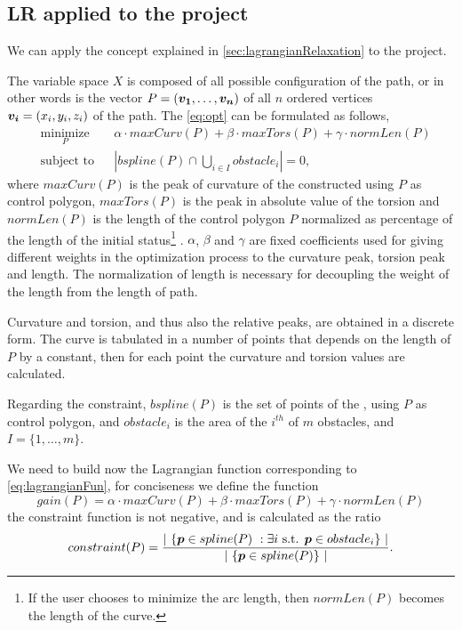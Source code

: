 \documentclass[dissertation.tex]{subfiles}
\begin{document}
\subsection{\acf{LR} applied to the project}
We can apply the concept explained in \cref{sec:lagrangianRelaxation}
to the project.

The variable space $X$ is composed of all possible
configuration of the path, or in other words is the vector
$P=(\boldsymbol{v_1},\dots,\boldsymbol{v_n})$ of all $n$ ordered
vertices $\boldsymbol{v_i}=(x_i,y_i,z_i)$ of the
path. The \cref{eq:opt} can be formulated as follows,
\begin{equation*}
  \begin{aligned}
    & \underset{P}{\text{minimize}}
    & & \alpha\cdot maxCurv(P)+\beta\cdot
    maxTors(P)+\gamma\cdot normLen(P) \\
    & \text{subject to}
    & & \left|bspline(P)\cap \bigcup_{i\in I}obstacle_i\right| = 0,
  \end{aligned}
\end{equation*}
where $maxCurv(P)$ is the peak of curvature of the \bs
constructed using $P$ as control polygon,
$maxTors(P)$ is the peak in absolute value of the torsion and
$normLen(P)$ is the length of the control polygon
$P$ normalized as percentage of the length of the initial
status\footnote{If the user chooses to minimize the
  arc length, then $normLen(P)$ becomes the length of the \bs curve.}
. $\alpha$, $\beta$ and $\gamma$ are fixed
coefficients used for giving different weights in the optimization
process to 
the curvature peak, torsion peak and length. The normalization of
length is necessary for decoupling the weight of the length from the
length of path.

Curvature and torsion, and thus also the
relative peaks, are obtained in a discrete form. The \bs curve is
tabulated in a number of points that depends on the length of $P$
by a constant, then for each point the curvature and torsion values
are calculated.

Regarding the constraint, $bspline(P)$
is the set of points of the \emph{\bs}, using $P$ as 
control polygon, and 
$obstacle_i$ is the area of the $i^{th}$ of $m$ obstacles, and
$I=\{1,\dots,m\}$.

We need to build now the Lagrangian function corresponding to
\cref{eq:lagrangianFun}, for conciseness we define the function
\begin{equation}\label{eq:gainLag}
  gain(P) = \alpha\cdot maxCurv(P)+\beta\cdot
    maxTors(P)+\gamma\cdot normLen(P)
\end{equation}
the constraint function is not negative, and is calculated as the
ratio
\begin{equation}\label{eq:constraintLag}
constraint(P) = \frac{\left|\ \{\boldsymbol{p} \in spline(P)\ : \exists i
    \text{ s.t. } \boldsymbol{p}\in
    obstacle_i\}\ \right|}{\left|\ \{\boldsymbol{p} \in
    spline(P)\}\ \right|}.
\end{equation}
\end{document}
